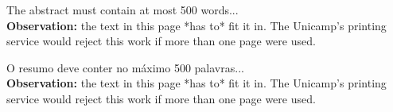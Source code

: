 \documentclass[%
        TwoSidePages,%
        Portuguese,%
        FinalVersion,%
        TablesPage,%
        FiguresPage,%
        ]%
{ic-tese-v2}
\begin{document}





        \beforepreface

        \begin{theabstract}
        The abstract must contain at most 500 words...\\

\textbf{Observation:} the text in this page *has to* fit it in. The Unicamp's printing service would reject this work
if more than one page were used.
        \end{theabstract}

%
        \begin{oresumo}
        O resumo deve conter no m{\'a}ximo 500 palavras...\\

\textbf{Observation:} the text in this page *has to* fit it in. The Unicamp's printing service would reject this work
if more than one page were used.
        \end{oresumo}
\end{document}
